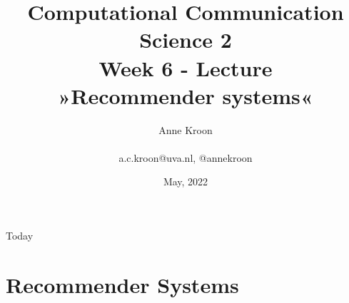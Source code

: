 \documentclass[handout]{beamer}
\title[Computational Communication Science 2]{\textbf{Computational Communication Science 2} \\Week 6 - Lecture\\ »Recommender systems«}
\author[Anne Kroon]{Anne Kroon \\ ~ \\ \footnotesize{a.c.kroon@uva.nl, @annekroon} \\}
\date{May, 2022}
\institute[Digital Society Minor, University of Amsterdam]{Digital Society Minor, University of Amsterdam}
\begin{document}
	
	\begin{frame}{}
		\titlepage
	\end{frame}
	
	\begin{frame}{Today}
		\tableofcontents
	\end{frame}

\section{Recommender Systems}


\begin{frame}
\end{frame}

\end{document}

